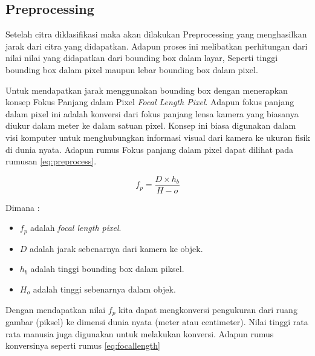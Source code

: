 
\subsection{Preprocessing}
Setelah citra diklasifikasi maka akan dilakukan Preprocessing yang menghasilkan jarak dari citra yang didapatkan. Adapun proses ini melibatkan perhitungan dari nilai nilai yang didapatkan dari bounding box dalam layar, Seperti tinggi bounding box dalam pixel maupun lebar bounding box dalam pixel.

Untuk mendapatkan jarak menggunakan bounding box dengan menerapkan konsep Fokus Panjang dalam Pixel \emph{Focal Length Pixel}. Adapun fokus panjang dalam pixel ini adalah konversi dari fokus panjang lensa kamera  yang biasanya diukur dalam meter ke dalam satuan pixel. Konsep ini biasa digunakan dalam visi komputer untuk menghubungkan informasi visual dari kamera ke ukuran fisik di dunia nyata. Adapun rumus Fokus panjang dalam pixel dapat dilihat pada rumusan \ref{eq:preprocess}.

\begin{equation}
  \label{eq:preprocess}
    f_p = \frac{D \times h_b}{H-o}
\end{equation}

Dimana :
\begin{itemize}
    \item $f_p$ adalah \emph{focal length pixel}.
    \item $D$ adalah jarak sebenarnya dari kamera ke objek.
    \item $h_b$ adalah tinggi bounding box dalam piksel.
    \item $H_o$ adalah tinggi sebenarnya dalam objek.
\end{itemize}

Dengan mendapatkan nilai $f_p$ kita dapat mengkonversi pengukuran dari ruang gambar (piksel) ke dimensi dunia nyata (meter atau centimeter). Nilai tinggi rata rata manusia juga digunakan untuk melakukan konversi. Adapun rumus konversinya seperti rumus \ref{eq:focallength}

